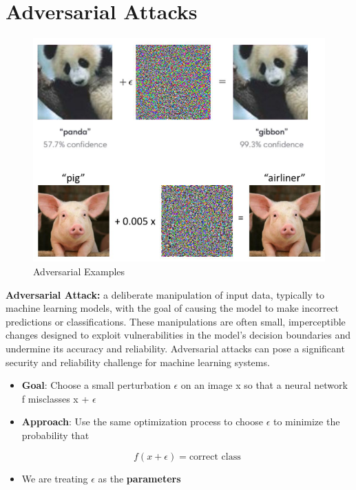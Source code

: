 \newpage

\section{Adversarial Attacks}

\begin{figure}[h!t]
    \centering
    \includegraphics[width=0.75\linewidth]{adversarialexamples.png}
    \caption{Adversarial Examples}
    \label{fig:enter-label}
\end{figure}

\begin{definition}
    \textbf{Adversarial Attack:}  a deliberate manipulation of input data, typically to machine learning models, with the goal of causing the model to make incorrect predictions or classifications. These manipulations are often small, imperceptible changes designed to exploit vulnerabilities in the model's decision boundaries and undermine its accuracy and reliability. Adversarial attacks can pose a significant security and reliability challenge for machine learning systems.
\end{definition}

\begin{itemize}
    \item \textbf{Goal}: Choose a small perturbation $\epsilon$ on an image x so that a neural network f misclasses x + $\epsilon$
    \item \textbf{Approach}: Use the same optimization process to choose $\epsilon$ to minimize the probability that

\[f(x + \epsilon) = \text{correct class}\]
\item We are treating $\epsilon$ as the \textbf{parameters}


\end{itemize}

